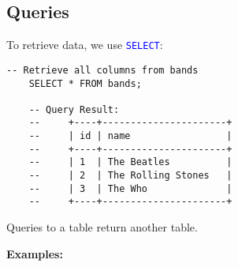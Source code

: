 \subsection{Queries}
To retrieve data, we use \textcolor{blue}{\texttt{SELECT}}:

\begin{lstlisting}[style=sql]
    -- Retrieve all columns from bands
    SELECT * FROM bands;

    -- Query Result:
    --     +----+----------------------+
    --     | id | name                 |
    --     +----+----------------------+
    --     | 1  | The Beatles          |
    --     | 2  | The Rolling Stones   |
    --     | 3  | The Who              |
    --     +----+----------------------+
\end{lstlisting}

\noindent
Queries to a table return another table.

\newpage

\noindent
\textbf{Examples:}\\

